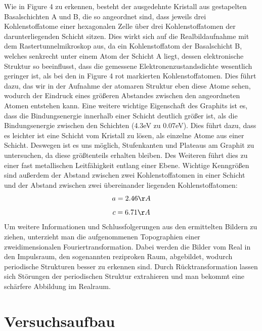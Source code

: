 \documentclass[10pt,a4paper]{article}
\begin{document}
	Wie in Figure 4 zu erkennen, besteht der ausgedehnte Kristall aus gestapelten Basalschichten A und B, die so angeordnet sind, dass jeweils drei Kohlenstoffatome einer hexagonalen Zelle über drei Kohlenstoffatomen der darunterliegenden Schicht sitzen. Dies wirkt sich auf die Realbildaufnahme mit dem Rastertunnelmikroskop aus, da ein Kohlenstoffatom der Basalschicht B, welches senkrecht unter einem Atom der Schicht A liegt, dessen elektronische Struktur so beeinflusst, dass die gemessene Elektronenzustandsdichte wesentlich geringer ist, als bei den in Figure 4 rot markierten Kohlenstoffatomen. Dies führt dazu, das wir in der Aufnahme der atomaren Struktur eben diese Atome sehen, wodurch der Eindruck eines größeren Abstandes zwischen den angeordneten Atomen entstehen kann. Eine weitere wichtige Eigenschaft des Graphits ist es, dass die Bindungsenergie innerhalb einer Schicht deutlich größer ist, als die Bindungsenergie zwischen den Schichten (4.3eV zu 0.07eV). Dies führt dazu, dass es leichter ist eine Schicht vom Kristall zu lösen, als einzelne Atome aus einer Schicht. Deswegen ist es uns möglich, Stufenkanten und Plateaus am Graphit zu untersuchen, da diese größtenteils erhalten bleiben. Des Weiteren führt dies zu einer fast metallischen Leitfähigkeit entlang einer Ebene. Wichtige Kenngrößen sind außerdem der Abstand zwischen zwei Kohlenstoffatomen in einer Schicht und der Abstand zwischen zwei übereinander liegenden Kohlenstoffatomen:
	$$a = 2.46 \AA$$
	$$c = 6.71 \AA$$
	Um weitere Informationen und Schlussfolgerungen aus den ermittelten Bildern zu ziehen, unterzieht man die aufgenommenen Topographien einer zweidimensionalen Fouriertransformation. Dabei werden die Bilder vom Real in den Impulsraum, den sogenannten reziproken Raum, abgebildet, wodurch periodische Strukturen besser zu erkennen sind. Durch Rücktransformation lassen sich Störungen der periodischen Struktur extrahieren und man bekommt eine schärfere Abbildung im Realraum.
	
	
	\section{	Versuchsaufbau}
	
\end{document}
